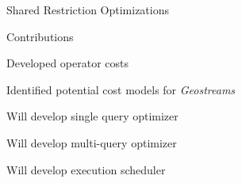 \documentclass[final,total,bgColor,slideColor,pdf,ps2pdf,default,noaccumulate]{prosper}
\begin{document}
\begin{slide}{Shared Restriction Optimizations}
  \centering
  \scalebox{0.8}{}
\end{slide}

\begin{slide}{Contributions}
  \begin{Itemize}
  \item Developed operator costs
  \item Identified potential cost models for \emph{Geostreams}
  \item Will develop single query optimizer
  \item Will develop multi-query optimizer
  \item Will develop execution scheduler 
  \end{Itemize}
\end{slide}

\end{document}

